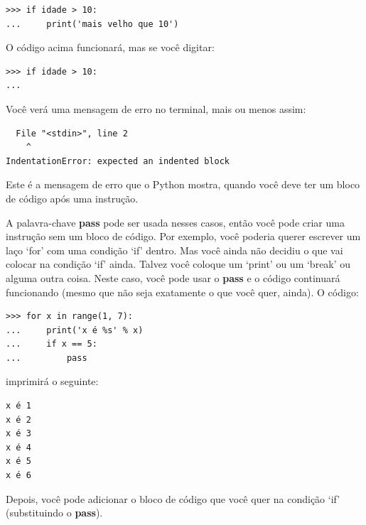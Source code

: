 \begin{listing}
\begin{verbatim}
>>> if idade > 10:
...     print('mais velho que 10')
\end{verbatim}
\end{listing}

\noindent
O código acima funcionará, mas se você digitar:

\begin{listingignore}
\begin{verbatim}
>>> if idade > 10:
...
\end{verbatim}
\end{listingignore}

\noindent
Você verá uma mensagem de erro no terminal, mais ou menos assim:

\begin{listingignore}
\begin{verbatim}
  File "<stdin>", line 2
    ^
IndentationError: expected an indented block
\end{verbatim}
\end{listingignore}

Este é a mensagem de erro que o Python mostra, quando você deve ter um bloco de código após uma instrução.
\par
A palavra-chave \textbf{pass} pode ser usada nesses casos, então você pode criar uma instrução sem um bloco de código. Por exemplo, você poderia querer escrever um laço `for' com uma condição `if' dentro. Mas você ainda não decidiu o que vai colocar na condição `if' ainda. Talvez você coloque um `print' ou um `break' ou alguma outra coisa. Neste caso, você pode usar o \textbf{pass} e o código continuará funcionando (mesmo que não seja exatamente o que você quer, ainda). O código:

\begin{listing}
\begin{verbatim}
>>> for x in range(1, 7):
...     print('x é %s' % x)
...     if x == 5:
...         pass
\end{verbatim}
\end{listing}

\noindent
imprimirá o seguinte:

\begin{listing}
\begin{verbatim}
x é 1
x é 2
x é 3
x é 4
x é 5
x é 6
\end{verbatim}
\end{listing}

\noindent
Depois, você pode adicionar o bloco de código que você quer na condição `if' (substituindo o \textbf{pass}).

